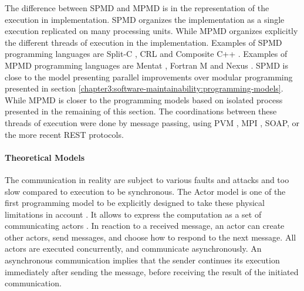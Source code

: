 

The difference between SPMD and MPMD is in the representation of the execution in implementation.
SPMD organizes the implementation as a single execution replicated on many processing units.
While MPMD organizes explicitly the different threads of execution in the implementation.
Examples of SPMD programming languages are
Split-C \cite{Culler},
CRL \cite{Johnson1995} and
Composite C++ \cite{K.ManiChandy2005}.
%
Examples of MPMD programming languages are
Mentat \cite{Grimshaw1991},
Fortran M \cite{Foster1995b} and
Nexus \cite{Foster1996}.
SPMD is close to the model presenting parallel improvements over modular programming presented in section \ref{chapter3:software-maintainability:programming-models}.
While MPMD is closer to the programming models based on isolated process presented in the remaining of this section.
The coordinations between these threads of execution were done by message passing, using PVM \cite{Sunderam1994}, MPI \cite{Snir1996,Walker1996}, SOAP, or the more recent REST protocols.



\paragraph{Theoretical Models}


The communication in reality are subject to various faults and attacks \cite{Lamport1982} and too slow compared to execution to be synchronous.
The Actor model is one of the first programming model to be explicitly designed to take these physical limitations in account \cite{Hewitt1977a}.
It allows to express the computation as a set of communicating actors \cite{Hewitt1973a, Hewitt1977, Clinger1981}.
In reaction to a received message, an actor can create other actors, send messages, and choose how to respond to the next message.
All actors are executed concurrently, and communicate asynchronously.
An asynchronous communication implies that the sender continues its execution immediately after sending the message, before receiving the result of the initiated communication.


